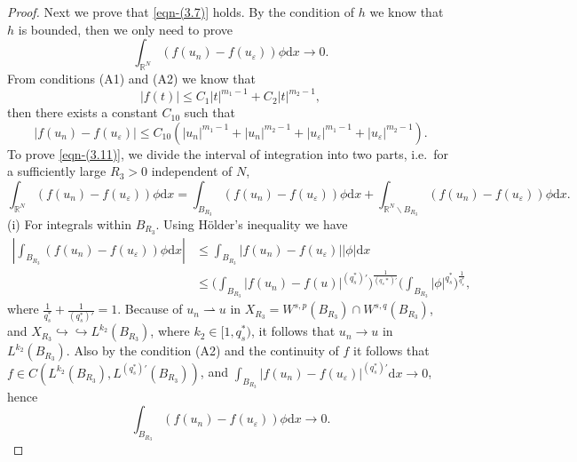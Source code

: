 \documentclass[10pt,a4paper]{amsart}
\numberwithin{equation}{section}
\begin{document}
\begin{proof}
Next we prove that \eqref{eqn-(3.7)} holds.
By the condition of $h$ we know that $h$ is bounded, then we only need to prove
\begin{equation}\label{eqn-(3.11)}
\int_{\mathbb{R}^N}(f(u_n)-f(u_\varepsilon))\phi\mathrm{d}x\to0.
\end{equation}
From conditions (A1) and (A2) we know that
$$
|f(t)|\leq C_1|t|^{m_1-1}+C_2|t|^{m_2-1},
$$
then there exists a constant $C_{10}$ such that
$$
|f(u_n)-f(u_\varepsilon)|\leq C_{10}(|u_n|^{m_1-1}+|u_n|^{m_2-1}
+|u_\varepsilon|^{m_1-1}+|u_\varepsilon|^{m_2-1}).
$$
To prove \eqref{eqn-(3.11)}, we divide the interval of integration into two parts, 
i.e.\ for a sufficiently large $R_3>0$ independent of $N$,
$$
\int_{\mathbb{R}^N}(f(u_n)-f(u_\varepsilon))\phi\mathrm{d}x
=\int_{B_{R_3}}(f(u_n)-f(u_\varepsilon))\phi\mathrm{d}x
 +\int_{\mathbb{R}^N\backslash{B_{R_3}}}(f(u_n)-f(u_\varepsilon))\phi\mathrm{d}x.
$$
(i) For integrals within $B_{R_3}$. Using H\"{o}lder's inequality we have
\begin{align*}
|\int_{B_{R_3}}(f(u_n)-f(u_\varepsilon))\phi\mathrm{d}x|
&\le\int_{B_{R_3}}|f(u_n)-f(u_\varepsilon)||\phi|\mathrm{d}x\\
&\le \big(\int_{B_{R_3}}|f(u_n)-f(u)|^{(q_{s}^{*})'}\Big)^{\frac{1}{(q_{s}*)'}}
 \Big(\int_{B_{R_3}}|\phi|^{q_{s}^{*}}\Big)^{\frac{1}{q_{s}^{*}}},
\end{align*}
where $\frac{1}{q_{s}^{*}}+\frac{1}{(q_{s}^{*})'}=1$. 
Because of $u_n\rightharpoonup u$ in $X_{R_3}=W^{s,p}(B_{R_3})\cap W^{s,q}(B_{R_3})$,
 and $X_{R_3}\hookrightarrow\hookrightarrow L^{k_2}(B_{R_3})$, 
 where $k_2\in[1,q_{s}^{*})$, it follows that $u_n\to u$ in $L^{k_2}(B_{R_3})$.
Also by the condition (A2) and the continuity of $f$ it follows that 
$f\in C(L^{k_2}(B_{R_3}),L^{(q_{s}^{*})'}(B_{R_3}))$, and 
$\int_{B_{R_3}}|f(u_n)-f(u_\varepsilon)|^{(q_{s}^{*})'}\mathrm{d}x\to 0$,
hence
$$
\int_{B_{R_3}}(f(u_n)-f(u_\varepsilon))\phi\mathrm{d}x\to 0.
$$


\end{proof}
\end{document}
